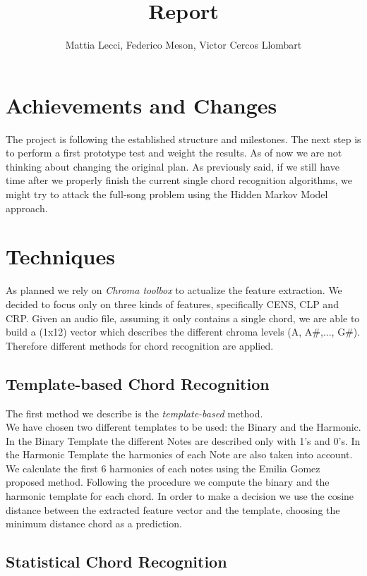 \documentclass[a4paper]{article}
\title{Report}
\author{Mattia Lecci, Federico Meson, Victor Cercos Llombart}
\begin{document}
\maketitle

\section{Achievements and Changes}
The project is following the established structure and milestones. The next step is to perform a first prototype test and weight the results. As of now we are not thinking about changing the original plan. As previously said, if we still have time after we properly finish the current single chord recognition algorithms, we might try to attack the full-song problem using the Hidden Markov Model approach.

\section{Techniques}
As planned we rely on \textit{Chroma toolbox} \cite{chroma_toolbox} to actualize the feature extraction. We decided to focus only on three kinds of features, specifically CENS, CLP and CRP. Given an audio file, assuming it only contains a single chord, we are able to build a (1x12) vector which describes the different chroma levels (A, A\#,..., G\#). Therefore different methods for chord recognition are applied.

\subsection{Template-based Chord Recognition}
The first method we describe is the \textit{template-based} method. \\
We have chosen two different templates to be used: the Binary and the Harmonic. In the Binary Template the different Notes are described only with 1's and 0's. In the Harmonic Template the harmonics of each Note are also taken into account. We calculate the first 6 harmonics of each notes using the Emilia Gomez \cite{gomez2006tonal} proposed method. 
Following the procedure we compute the binary and the harmonic template for each chord. In order to make a decision we use the cosine distance between the extracted feature vector and the template, choosing the minimum distance chord as a prediction.

\subsection{Statistical Chord Recognition}
\end{document}

